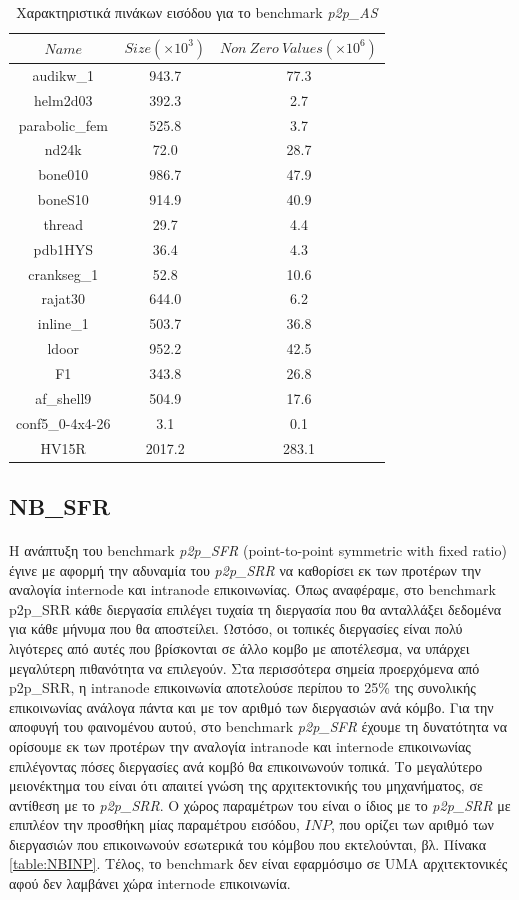 \begin{table}[h]
\centering
\caption{Χαρακτηριστικά πινάκων εισόδου για το benchmark \textit{p2p\_AS}}
\label{table:CG_matrices}
\begin{tabular}{c|c|c}
$Name$ & $Size(\times 10^3)$ & $Non\ Zero\ Values (\times 10^6)$ \\ \hline \hline
audikw\_1 & 943.7 & 77.3 \\
helm2d03 & 392.3 & 2.7 \\
parabolic\_fem & 525.8 & 3.7 \\
nd24k & 72.0 &  28.7 \\
bone010 & 986.7 & 47.9 \\
boneS10 & 914.9 & 40.9 \\
thread & 29.7 & 4.4 \\
pdb1HYS & 36.4 & 4.3 \\
crankseg\_1 & 52.8 & 10.6 \\
rajat30 & 644.0 & 6.2 \\
inline\_1 & 503.7 & 36.8 \\
ldoor & 952.2 & 42.5 \\
F1 & 343.8 & 26.8 \\
af\_shell9 & 504.9 & 17.6\\
conf5\_0-4x4-26 & 3.1 & 0.1 \\
HV15R & 2017.2 & 283.1 \\    
\end{tabular}
\end{table}

\subsection{NB\_SFR}
\paragraph{}
Η ανάπτυξη του benchmark \textit{p2p\_SFR} (point-to-point symmetric with fixed ratio) έγινε με αφορμή την αδυναμία του \textit{p2p\_SRR} να καθορίσει εκ των προτέρων την αναλογία internode και intranode επικοινωνίας. Όπως αναφέραμε, στο benchmark p2p\_SRR κάθε διεργασία επιλέγει τυχαία τη διεργασία που θα ανταλλάξει δεδομένα για κάθε μήνυμα που θα αποστείλει. Ωστόσο, οι τοπικές διεργασίες είναι πολύ λιγότερες από αυτές που βρίσκονται σε άλλο κομβο με αποτέλεσμα, να υπάρχει μεγαλύτερη πιθανότητα να επιλεγούν. Στα περισσότερα σημεία προερχόμενα από p2p\_SRR, η intranode επικοινωνία αποτελούσε περίπου το 25\% της συνολικής επικοινωνίας ανάλογα πάντα και με τον αριθμό των διεργασιών ανά κόμβο. Για την αποφυγή του φαινομένου αυτού, στο benchmark \textit{p2p\_SFR} έχουμε τη δυνατότητα να ορίσουμε εκ των προτέρων την αναλογία intranode και internode επικοινωνίας  επιλέγοντας πόσες διεργασίες ανά κομβό θα επικοινωνούν τοπικά. Το μεγαλύτερο μειονέκτημα του είναι ότι απαιτεί γνώση της αρχιτεκτονικής του μηχανήματος, σε αντίθεση με το \textit{p2p\_SRR}. Ο χώρος παραμέτρων του είναι ο ίδιος με το \textit{p2p\_SRR} με επιπλέον την προσθήκη μίας παραμέτρου εισόδου, $INP$, που ορίζει των αριθμό των διεργασιών που επικοινωνούν εσωτερικά του κόμβου που εκτελούνται, βλ. Πίνακα \ref{table:NBINP}. Τέλος, το benchmark δεν είναι εφαρμόσιμο σε UMA αρχιτεκτονικές αφού δεν λαμβάνει χώρα internode επικοινωνία.

